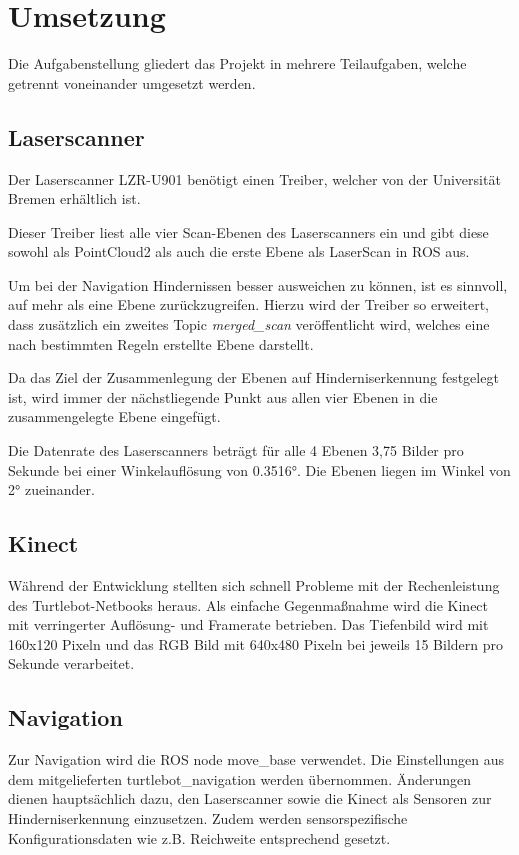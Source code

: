\section{Umsetzung}
Die Aufgabenstellung gliedert das Projekt in mehrere Teilaufgaben, welche getrennt voneinander umgesetzt werden.

\subsection{Laserscanner}
Der Laserscanner LZR-U901 benötigt einen Treiber, welcher von der Universität Bremen erhältlich ist.

Dieser Treiber liest alle vier Scan-Ebenen des Laserscanners ein und gibt diese sowohl als PointCloud2 als auch die erste Ebene als LaserScan in ROS aus.

Um bei der Navigation Hindernissen besser ausweichen zu können, ist es sinnvoll, auf mehr als eine Ebene zurückzugreifen. Hierzu wird der Treiber so erweitert, dass zusätzlich ein zweites Topic \emph{merged_scan} veröffentlicht wird, welches eine nach bestimmten Regeln erstellte Ebene darstellt.

Da das Ziel der Zusammenlegung der Ebenen auf Hinderniserkennung festgelegt ist, wird immer der nächstliegende Punkt aus allen vier Ebenen in die zusammengelegte Ebene eingefügt.

Die Datenrate des Laserscanners beträgt für alle 4 Ebenen 3,75 Bilder pro Sekunde bei einer Winkelauflösung von 0.3516°. Die Ebenen liegen im Winkel von 2° zueinander.



\subsection{Kinect}
Während der Entwicklung stellten sich schnell Probleme mit der Rechenleistung des Turtlebot-Netbooks heraus. Als einfache Gegenmaßnahme wird die Kinect mit verringerter Auflösung- und Framerate betrieben. Das Tiefenbild wird mit 160x120 Pixeln und das RGB Bild mit 640x480 Pixeln bei jeweils 15 Bildern pro Sekunde verarbeitet.

\subsection{Navigation}
Zur Navigation wird die ROS node move_base verwendet. Die Einstellungen aus dem mitgelieferten turtlebot_navigation werden übernommen. Änderungen dienen hauptsächlich dazu, den Laserscanner sowie die Kinect als Sensoren zur Hinderniserkennung einzusetzen. Zudem werden sensorspezifische Konfigurationsdaten wie z.B. Reichweite entsprechend gesetzt.


